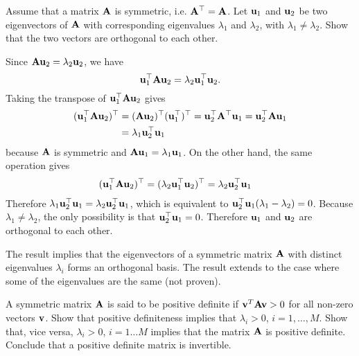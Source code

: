 \label{ex:eigenvalue-decomposition-symmetric-matrices}
\begin{exenumerate}
\item Assume that a matrix $\mathbf{A}$ is symmetric, i.e. $\mathbf{A}^\top=\mathbf{A}$. Let $\mathbf{u}_1$ and
  $\mathbf{u}_2$ be two eigenvectors of $\mathbf{A}$ with corresponding eigenvalues $\lambda_1$
  and $\lambda_2$, with $\lambda_1 \neq \lambda_2$. Show that the two vectors
  are orthogonal to each other.

  \begin{solution}
    Since $\mathbf{A}\mathbf{u}_2 = \lambda_2\mathbf{u}_2$, we have
    \begin{equation}
      \mathbf{u}_1^\top \mathbf{A}\mathbf{u}_2 = \lambda_2\mathbf{u}_1^\top\mathbf{u}_2.
    \end{equation}
    Taking the transpose of $\mathbf{u}_1^\top \mathbf{A}\mathbf{u}_2$ gives
    \begin{align}
      (\mathbf{u}_1^\top \mathbf{A}\mathbf{u}_2)^\top &= (\mathbf{A}\mathbf{u}_2)^\top(\mathbf{u}_1^\top)^\top = \mathbf{u}_2^\top \mathbf{A}^\top \mathbf{u}_1 = \mathbf{u}_2^\top \mathbf{A}\mathbf{u}_1 \\
                              & = \lambda_1\mathbf{u}_2^\top\mathbf{u}_1
    \end{align}
    because $\mathbf{A}$ is symmetric and $\mathbf{A} \mathbf{u}_1 = \lambda_1 \mathbf{u}_1$. On the other hand, the same operation gives
    \begin{align}
      (\mathbf{u}_1^\top \mathbf{A}\mathbf{u}_2)^\top &= (\lambda_2\mathbf{u}_1^\top\mathbf{u}_2)^\top = \lambda_2\mathbf{u}_2^\top\mathbf{u}_1
    \end{align}
    Therefore $\lambda_1\mathbf{u}_2^\top\mathbf{u}_1 = \lambda_2\mathbf{u}_2^\top\mathbf{u}_1$, which is equivalent to $\mathbf{u}_2^\top\mathbf{u}_1(\lambda_1 - \lambda_2) = 0$. Because
    $\lambda_1 \neq \lambda_2$, the only possibility is that
    $\mathbf{u}_2^\top\mathbf{u}_1 = 0$. Therefore $\mathbf{u}_1$ and $\mathbf{u}_2$ are orthogonal to each other.

    The result implies that the eigenvectors of a symmetric matrix $\mathbf{A}$ with
    distinct eigenvalues $\lambda_i$ forms an orthogonal basis. The result
    extends to the case where some of the eigenvalues are the same (not proven).


  \end{solution}

\item A symmetric matrix $\mathbf{A}$ is said to be positive definite if $\mathbf{v}^T\mathbf{A}\mathbf{v}>0$
  for all non-zero vectors $\mathbf{v}$. Show that positive definiteness implies that
  $\lambda_i>0$, $i=1,\ldots, M$. Show that, vice versa, $\lambda_i>0$,
  $i=1 \ldots M$ implies that the matrix $\mathbf{A}$ is positive definite. Conclude
  that a positive definite matrix is invertible.


\end{exenumerate}
